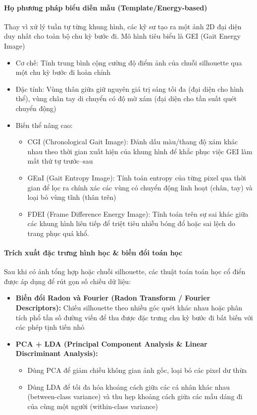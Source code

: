 \paragraph{Họ phương pháp biểu diễn mẫu (Template/Energy-based)} 

Thay vì xử lý tuần tự từng khung hình, các kỹ sư tạo ra một ảnh 2D đại diện duy nhất cho toàn bộ chu kỳ bước đi. Mô hình tiêu biểu là GEI (Gait Energy Image)

\begin{itemize}
    \item Cơ chế: Tính trung bình cộng cường độ điểm ảnh của chuỗi silhouette qua một chu kỳ bước đi hoàn chỉnh
    \item Đặc tính: Vùng thân giữa giữ nguyên giá trị sáng tối đa (đại diện cho hình thể), vùng chân tay di chuyển có độ mờ xám (đại diện cho tần suất quét chuyển động)
    \item Biến thể nâng cao:
    \begin{itemize}
        \item CGI (Chronological Gait Image): Đánh dấu màu/thang độ xám khác nhau theo thời gian xuất hiện của khung hình để khắc phục việc GEI làm mất thứ tự trước–sau
        \item GEnI (Gait Entropy Image): Tính toán entropy của từng pixel qua thời gian để lọc ra chính xác các vùng có chuyển động linh hoạt (chân, tay) và loại bỏ vùng tĩnh (thân trên)
        \item FDEI (Frame Difference Energy Image): Tính toán trên sự sai khác giữa các khung hình liên tiếp để triệt tiêu nhiễu bóng đổ hoặc sai lệch do trang phục quá khổ.
    \end{itemize} 
\end{itemize}

\paragraph{Trích xuất đặc trưng hình học \& biến đổi toán học}
Sau khi có ảnh tổng hợp hoặc chuỗi silhouette, các thuật toán toán học cổ điển được áp dụng để rút gọn số chiều dữ liệu:

\begin{itemize}
    \item \textbf{Biến đổi Radon và Fourier (Radon Transform / Fourier Descriptors):} Chiếu silhouette theo nhiều góc quét khác nhau hoặc phân tích phổ tần số đường viền để thu được đặc trưng chu kỳ bước đi bất biến với các phép tịnh tiến nhỏ
    \item \textbf{PCA + LDA (Principal Component Analysis \& Linear Discriminant Analysis):} 
    \begin{itemize}
        \item Dùng PCA để giảm chiều không gian ảnh gốc, loại bỏ các pixel dư thừa
        \item Dùng LDA để tối đa hóa khoảng cách giữa các cá nhân khác nhau (between-class variance) và thu hẹp khoảng cách giữa các mẫu dáng đi của cùng một người (within-class variance)
    \end{itemize}
    
\end{itemize}


